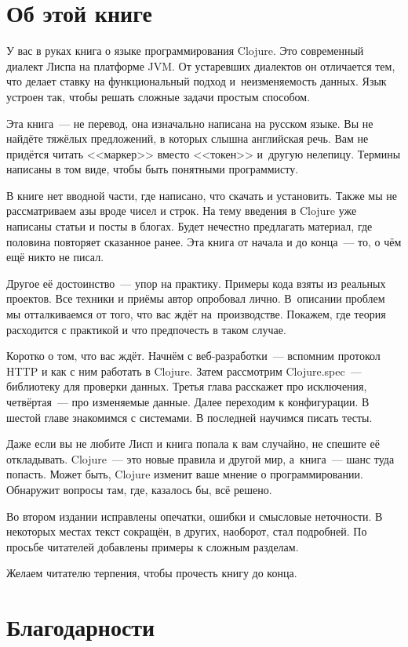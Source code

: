 
\section*{Об этой книге}

У вас в руках книга о языке программирования Clojure. Это современный диалект
Лиспа на платформе JVM. От устаревших диалектов он отличается тем, что делает
ставку на функциональный подход и~неизменяемость данных. Язык устроен так, чтобы
решать сложные задачи простым способом.

Эта книга~--- не перевод, она изначально написана на русском языке. Вы не найдёте
тяжёлых предложений, в которых слышна английская речь. Вам не придётся читать
<<маркер>> вместо <<токен>> и~другую нелепицу. Термины написаны в том виде,
чтобы быть понятными программисту.

В книге нет вводной части, где написано, что скачать и установить. Также мы не
рассматриваем азы вроде чисел и строк. На тему введения в Clojure уже написаны
статьи и посты в блогах. Будет нечестно предлагать материал, где половина
повторяет сказанное ранее. Эта книга от начала и до конца~--- то, о чём ещё
никто не писал.

Другое её достоинство~--- упор на практику. Примеры кода взяты из реальных
проектов. Все техники и приёмы автор опробовал лично. В~описании проблем мы
отталкиваемся от того, что вас ждёт на~производстве. Покажем, где теория
расходится с практикой и что предпочесть в таком случае.

Коротко о том, что вас ждёт. Начнём с веб-разработки~--- вспомним протокол HTTP
и как с ним работать в Clojure. Затем рассмотрим Clojure.spec~--- библиотеку для
проверки данных. Третья глава расскажет про исключения, четвёртая~--- про
изменяемые данные. Далее переходим к конфигурации. В шестой главе знакомимся с
системами. В последней научимся писать тесты.

Даже если вы не любите Лисп и книга попала к вам случайно, не спешите её
откладывать. Clojure~--- это новые правила и другой мир, а~книга~--- шанс туда
попасть. Может быть, Clojure изменит ваше мнение о программировании. Обнаружит
вопросы там, где, казалось бы, всё решено.

Во втором издании исправлены опечатки, ошибки и смысловые неточности. В
некоторых местах текст сокращён, в других, наоборот, стал подробней. По просьбе
читателей добавлены примеры к сложным разделам.

Желаем читателю терпения, чтобы прочесть книгу до конца.

\section*{Благодарности}

